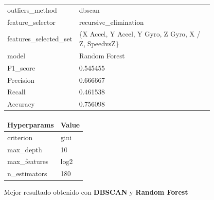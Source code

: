 \begin{appendices}
		\begin{figure}[htb]
			\centering
			\begin{tabular}{ll}
				\toprule
					  outliers\_method &                                             dbscan \\
					 feature\_selector &                              recursive\_elimination \\
				features\_selected\_set & \{X Accel, Y Accel, Y Gyro, Z Gyro, X / Z, SpeedvsZ\}\\
								model &                                      Random Forest \\
							 F1\_score &                                           0.545455 \\
							Precision &                                           0.666667 \\
							   Recall &                                           0.461538 \\
							 Accuracy &                                           0.756098 \\
				\bottomrule
			\end{tabular}
			\newline
			\newline

			\begin{tabular}{ll}
				\toprule
				 Hyperparams & Value \\
				\midrule
				   criterion &  gini \\
				   max\_depth &    10 \\
				max\_features &  log2 \\
				n\_estimators &   180 \\
				\bottomrule
			\end{tabular}
			\caption{Mejor resultado obtenido con \textbf{DBSCAN} y \textbf{Random Forest}}
			\label{table:32}

		\end{figure}


\end{appendices}
